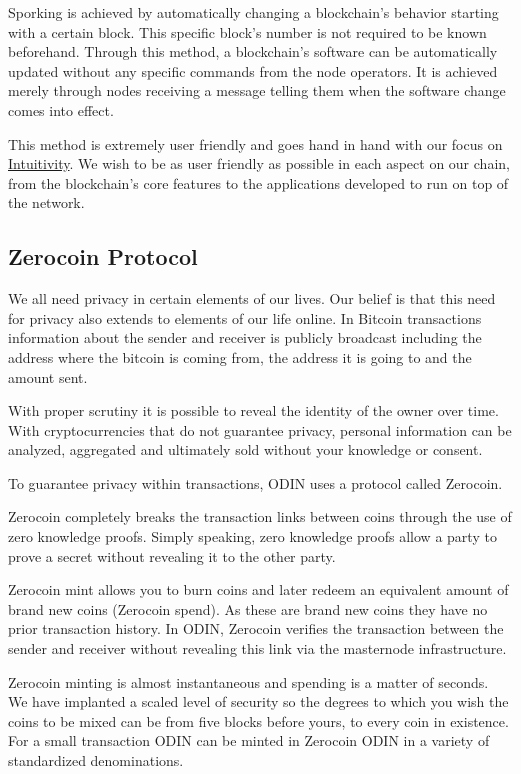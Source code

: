 Sporking is achieved by automatically changing a blockchain's behavior starting with a certain block. This specific block's number is not required to be known beforehand. Through this method, a blockchain's software can be automatically updated without any specific commands from the node operators. It is achieved merely through nodes receiving a message telling them when the software change comes into effect.

This method is extremely user friendly and goes hand in hand with our focus on \href{https://odinblockchain.org/#intuitive}{Intuitivity}. We wish to be as user friendly as possible in each aspect on our chain, from the blockchain's core features to the applications developed to run on top of the network.

\subsection{Zerocoin Protocol}
We all need privacy in certain elements of our lives.  Our belief is that this need for privacy also extends to elements of our life online.  In Bitcoin transactions information about the sender and receiver is publicly broadcast including the address where the bitcoin is coming from, the address it is going to and the amount sent. 

With proper scrutiny it is possible to reveal the identity of the owner over time. With cryptocurrencies that do not guarantee privacy, personal information can be analyzed, aggregated and ultimately sold without your knowledge or consent.

To guarantee privacy within transactions, ODIN uses a protocol called Zerocoin.  

Zerocoin completely breaks the transaction links between coins through the use of zero knowledge proofs. Simply speaking, zero knowledge proofs allow a party to prove a secret without revealing it to the other party.

Zerocoin mint allows you to burn coins and later redeem an equivalent amount of brand new coins (Zerocoin spend).  As these are brand new coins they have no prior transaction history.  In ODIN, Zerocoin verifies the transaction between the sender and receiver without revealing this link via the masternode infrastructure.  

Zerocoin minting is almost instantaneous and spending is a matter of seconds.
We have implanted a scaled level of security so the degrees to which you wish the coins to be mixed can be from five blocks before yours, to every coin in existence. For a small transaction ODIN can be minted in Zerocoin ODIN in a variety of standardized denominations.

